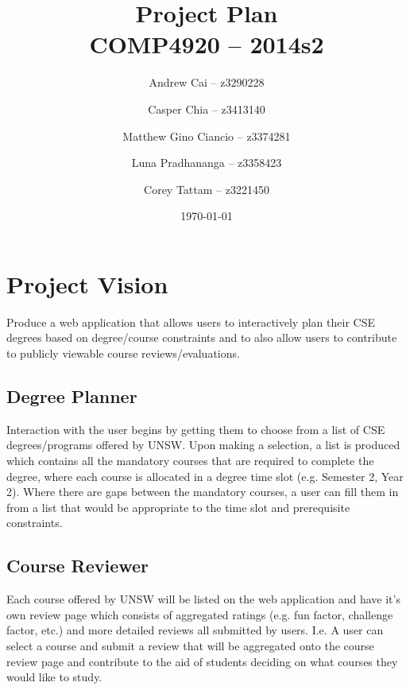 \documentclass[12pt,titlepage]{article}
\begin{document}
\title{
   Project Plan \\
   COMP4920 -- 2014s2
}

\author{
   Andrew Cai -- z3290228 \\
   \and
   Casper Chia -- z3413140 \\
   \and 
   Matthew Gino Ciancio -- z3374281 \\
   \and
   Luna Pradhananga -- z3358423 \\
   \and
   Corey Tattam -- z3221450
}

\date{\today}

\maketitle

\newpage
\tableofcontents
\newpage

\section{Project Vision}
Produce a web application that allows users to interactively plan their CSE
degrees based on degree/course constraints and to also allow users to contribute
to publicly viewable course reviews/evaluations.

\subsection{Degree Planner}
Interaction with the user begins by getting them to choose from a list of
CSE degrees/programs offered by UNSW. Upon making a selection, a list is
produced which contains all the mandatory courses that are required to complete
the degree, where each course is allocated in a degree time slot (e.g. Semester
2, Year 2). Where there are gaps between the mandatory courses, a user can fill
them in from a list that would be appropriate to the time slot and prerequisite
constraints.

\subsection{Course Reviewer}
Each course offered by UNSW will be listed on the web application and have it's
own review page which consists of aggregated ratings (e.g. fun factor, challenge
factor, etc.) and more detailed reviews all submitted by users. I.e. A user can
select a course and submit a review that will be aggregated onto the course
review page and contribute to the aid of students deciding on what courses
they would like to study.
\end{document}
